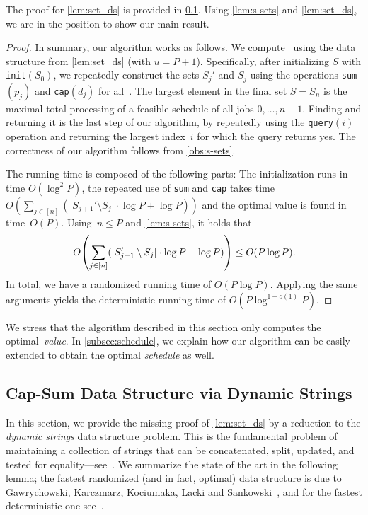 \documentclass[10pt,a4paper]{article}
\DeclarePairedDelimiter\parens{\lparen}{\rparen}
\newcommand\Oo{O}
\newcommand{\Op}[1]{{\normalfont\texttt{#1}}}
\begin{document}
The proof for \cref{lem:set_ds} is provided in \cref{subsec:dynamic-string-data-structure}.
Using \cref{lem:s-sets} and \ref{lem:set_ds}, we are in the position to show our main result.

\MTPTalgorithm*
\begin{proof}
    In summary, our algorithm works as follows. We compute~ using the data structure from \cref{lem:set_ds} (with $u = P + 1$).
    Specifically, after initializing $S$ with \Op{init}$(S_0)$, we repeatedly construct the sets $S_j'$ and $S_j$ using the operations \Op{sum}$(p_j)$ and \Op{cap}$(d_j)$ for all~.
    The largest element in the final set $S = S_n$ is the maximal total processing of a feasible schedule of all jobs $0, \dots, n-1$.
    Finding and returning it is the last step of our algorithm, by repeatedly using the \Op{query}$(i)$ operation and returning the largest index~$i$ for which the query returns yes.
    The correctness of our algorithm follows from \cref{obs:s-sets}.

    The running time is composed of the following parts:
    The initialization runs in time $\Oo(\log^2 P)$, the repeated use of \Op{sum} and \Op{cap} takes time $\Oo(\sum_{j\in [n]} (|S_{j+1}' \setminus S_j| \cdot \log P + \log P))$ and the optimal value is found in time~$\Oo(P)$.
    Using~$n \le P$ and \cref{lem:s-sets}, it holds that 
    \[
        \Oo\parens*{\sum_{j\in [n]} (|S_{j+1}' \setminus S_j| \cdot \log P + \log P)} \le \Oo(P\log P).
    \]
    In total, we have a randomized running time of $\Oo(P\log P)$.
    Applying the same arguments yields the deterministic running time of $\Oo(P \log^{1 + o(1)}P)$.
\end{proof}

We stress that the algorithm described in this section only computes the optimal~\emph{value}. 
In \cref{subsec:schedule}, we explain how our algorithm can be easily extended to obtain the optimal \emph{schedule} as well.


\subsection{Cap-Sum Data Structure via Dynamic Strings}
\label{subsec:dynamic-string-data-structure}
In this section, we provide the missing proof of \cref{lem:set_ds} by a reduction to the \emph{dynamic strings} data structure problem. This is the fundamental problem of maintaining a collection of strings that can be concatenated, split, updated, and tested for equality---see~\cite{SundarT94,PughT89,MehlhornSU97,AlstrupBR00,GawrychowskiKKL18}. We summarize the state of the art in the following lemma; the fastest randomized (and in fact, optimal) data structure is due to Gawrychowski, Karczmarz, Kociumaka, Lacki and Sankowski~\cite{GawrychowskiKKL18}, and for the fastest deterministic one see~\cite[Section~8]{KempaK22}.
\end{document}
